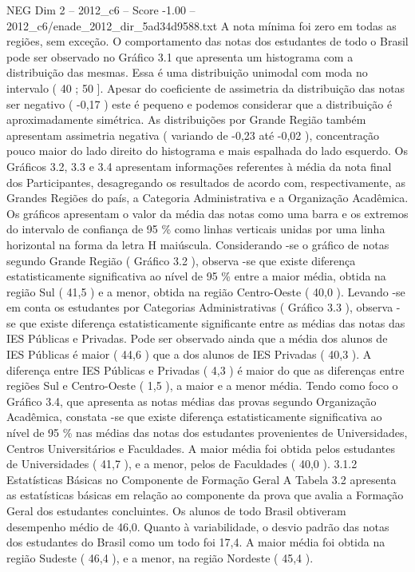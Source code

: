 \begin{textsample}{NEG Dim 2 – 2012\_c6 – Score -1.00 – 2012\_c6/enade\_2012\_dir\_5ad34d9588.txt}
A nota mínima foi zero em todas as regiões, sem exceção.
O comportamento das notas dos estudantes de todo o Brasil pode ser observado no Gráfico 3.1 que apresenta um histograma com a distribuição das mesmas.
Essa é uma distribuição unimodal com moda no intervalo ( 40 ; 50 ].
Apesar do coeficiente de assimetria da distribuição das notas ser negativo ( -0,17 ) este é pequeno e podemos considerar que a distribuição é aproximadamente simétrica.
As distribuições por Grande Região também apresentam assimetria negativa ( variando de -0,23 até -0,02 ), concentração pouco maior do lado direito do histograma e mais espalhada do lado esquerdo.
Os Gráficos 3.2, 3.3 e 3.4 apresentam informações referentes à média da nota final dos Participantes, desagregando os resultados de acordo com, respectivamente, as Grandes Regiões do país, a Categoria Administrativa e a Organização Acadêmica.
Os gráficos apresentam o valor da média das notas como uma barra e os extremos do intervalo de confiança de 95 \% como linhas verticais unidas por uma linha horizontal na forma da letra H maiúscula.
Considerando -se o gráfico de notas segundo Grande Região ( Gráfico 3.2 ), observa -se que existe diferença estatisticamente significativa ao nível de 95 \% entre a maior média, obtida na região Sul ( 41,5 ) e a menor, obtida na região Centro-Oeste ( 40,0 ).
Levando -se em conta os estudantes por Categorias Administrativas ( Gráfico 3.3 ), observa -se que existe diferença estatisticamente significante entre as médias das notas das IES Públicas e Privadas.
Pode ser observado ainda que a média dos alunos de IES Públicas é maior ( 44,6 ) que a dos alunos de IES Privadas ( 40,3 ).
A diferença entre IES Públicas e Privadas ( 4,3 ) é maior do que as diferenças entre regiões Sul e Centro-Oeste ( 1,5 ), a maior e a menor média.
Tendo como foco o Gráfico 3.4, que apresenta as notas médias das provas segundo Organização Acadêmica, constata -se que existe diferença estatisticamente significativa ao nível de 95 \% nas médias das notas dos estudantes provenientes de Universidades, Centros Universitários e Faculdades.
A maior média foi obtida pelos estudantes de Universidades ( 41,7 ), e a menor, pelos de Faculdades ( 40,0 ). 3.1.2 Estatísticas Básicas no Componente de Formação Geral A Tabela 3.2 apresenta as estatísticas básicas em relação ao componente da prova que avalia a Formação Geral dos estudantes concluintes.
Os alunos de todo Brasil obtiveram desempenho médio de 46,0.
Quanto à variabilidade, o desvio padrão das notas dos estudantes do Brasil como um todo foi 17,4.
A maior média foi obtida na região Sudeste ( 46,4 ), e a menor, na região Nordeste ( 45,4 ).

\end{textsample}
